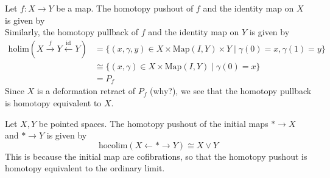 \documentclass[a4paper]{article}
\begin{document}
\begin{eg}{}{} Let $f:X\to Y$ be a map. The homotopy pushout of $f$ and the identity map on $X$ is given by $$$$ Similarly, the homotopy pullback of $f$ and the identity map on $Y$ is given by 
\begin{align*}
\text{holim}(X\overset{f}{\rightarrow}Y\overset{\text{id}}{\leftarrow}Y)&=\{(x,\gamma,y)\in X\times\text{Map}(I,Y)\times Y\;|\;\gamma(0)=x,\gamma(1)=y\}\\
&\cong\{(x,\gamma)\in X\times\text{Map}(I,Y)\;|\;\gamma(0)=x\}\\
&=P_f
\end{align*}
Since $X$ is a deformation retract of $P_f$ (why?), we see that the homotopy pullback is homotopy equivalent to $X$. 
\end{eg}

\begin{eg}{}{} Let $X,Y$ be pointed spaces. The homotopy pushout of the initial maps $\ast\to X$ and $\ast\to Y$ is given by $$\text{hocolim}(X\leftarrow\ast\rightarrow Y)\cong X\vee Y$$ This is because the initial map are cofibrations, so that the homotopy pushout is homotopy equivalent to the ordinary limit. 
\end{eg}

\begin{eg}{}{}
\end{eg}
\end{document}
